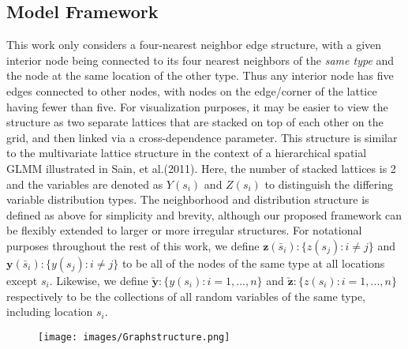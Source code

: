 \documentclass[12pt, a4paper, twoside]{article}
\begin{document}
\subsection{Model Framework}\label{framework}
This work only considers a four-nearest neighbor edge structure, with a given interior node being connected to its four nearest neighbors of the \textit{same type} and the node at the same location of the other type. Thus any interior node has five edges connected to other nodes, with nodes on the edge/corner of the lattice having fewer than five. For visualization purposes, it may be easier to view the structure as two separate lattices that are stacked on top of each other on the grid, and then linked via a cross-dependence parameter. This structure is similar to the multivariate lattice structure in the context of a hierarchical spatial GLMM illustrated in Sain, et al.(2011). Here, the number of stacked lattices is 2 and the variables are denoted as $Y(s_i)$ and $Z(s_i)$ to distinguish the differing variable distribution types. The neighborhood and distribution structure is defined as above for simplicity and brevity, although our proposed framework can be flexibly extended to larger or more irregular structures. For notational purposes throughout the rest of this work, we define $\boldsymbol{z}(\bar{s}_i):\lbrace z(s_j):i\neq j\rbrace$ and $\boldsymbol{y}(\bar{s}_i):\lbrace y(s_j):i\neq j\rbrace$ to be all of the nodes of the same type at all locations except $s_i$. Likewise, we define $\boldsymbol{\utilde{y}} : \lbrace y(s_i):i = 1,...,n\rbrace $ and $\boldsymbol{\utilde{z}} : \lbrace z(s_i):i = 1,...,n\rbrace$ respectively to be the collections of all random variables of the same type, including location $s_i$.
\begin{figure}[h]
	\centering
	\texttt{[image: images/Graphstructure.png]}
\end{figure}
\end{document}
